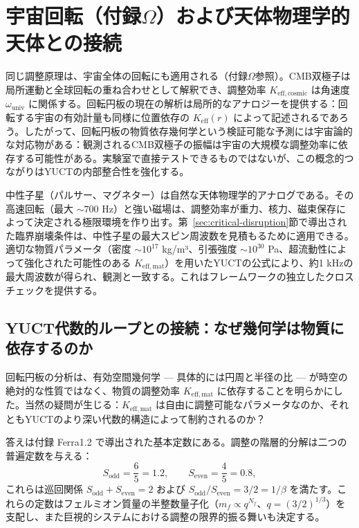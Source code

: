 \documentclass[12pt,a4paper]{article}
\begin{document}
	\section{宇宙回転（付録\(\Omega\)）および天体物理学的天体との接続}
	\label{sec:cosmic}
	
	同じ調整原理は、宇宙全体の回転にも適用される（付録\(\Omega\)参照）。CMB双極子は局所運動と全球回転の重ね合わせとして解釈でき、調整効率 \(K_{\mathrm{eff,cosmic}}\) は角速度 \(\omega_{\text{univ}}\) に関係する。回転円板の現在の解析は局所的なアナロジーを提供する：回転する宇宙の有効計量も同様に位置依存の \(K_{\mathrm{eff}}(r)\) によって記述されるであろう。したがって、回転円板の物質依存幾何学という検証可能な予測には宇宙論的な対応物がある：観測されるCMB双極子の振幅は宇宙の大規模な調整効率に依存する可能性がある。実験室で直接テストできるものではないが、この概念的つながりはYUCTの内部整合性を強化する。
	
	中性子星（パルサー、マグネター）は自然な天体物理学的アナログである。その高速回転（最大 \(\sim 700\) Hz）と強い磁場は、調整効率が重力、核力、磁束保存によって決定される極限環境を作り出す。第~\ref{sec:critical-disruption}節で導出された臨界崩壊条件は、中性子星の最大スピン周波数を見積もるために適用できる。適切な物質パラメータ（密度 \(\sim 10^{17}\) kg/m³、引張強度 \(\sim 10^{30}\) Pa、超流動性によって強化された可能性のある \(K_{\mathrm{eff,mat}}\)）を用いたYUCTの公式により、約1 kHzの最大周波数が得られ、観測と一致する。これはフレームワークの独立したクロスチェックを提供する。
	
	\subsection{YUCT代数的ループとの接続：なぜ幾何学は物質に依存するのか}
	\label{subsec:ehrenfest-algebraic-loop}
	
	回転円板の分析は、有効空間幾何学 — 具体的には円周と半径の比 — が時空の絶対的な性質ではなく、物質の調整効率 \(K_{\mathrm{eff,mat}}\) に依存することを明らかにした。当然の疑問が生じる：\(K_{\mathrm{eff,mat}}\) は自由に調整可能なパラメータなのか、それともYUCTのより深い代数的構造によって制約されるのか？
	
	答えは付録 Ferra1.2 で導出された基本定数にある。調整の階層的分解は二つの普遍定数を与える：
	\[
	S_{\mathrm{odd}} = \frac{6}{5} = 1.2,\qquad S_{\mathrm{even}} = \frac{4}{5} = 0.8,
	\]
	これらは巡回関係 \(S_{\mathrm{odd}}+S_{\mathrm{even}}=2\) および \(S_{\mathrm{odd}}/S_{\mathrm{even}} = 3/2 = 1/\beta\) を満たす。これらの定数はフェルミオン質量の半整数量子化（\(m_f \propto q^{N_f}\)、\(q = (3/2)^{1/3}\)）を支配し、また巨視的システムにおける調整の限界的振る舞いも決定する。
	
\end{document}

